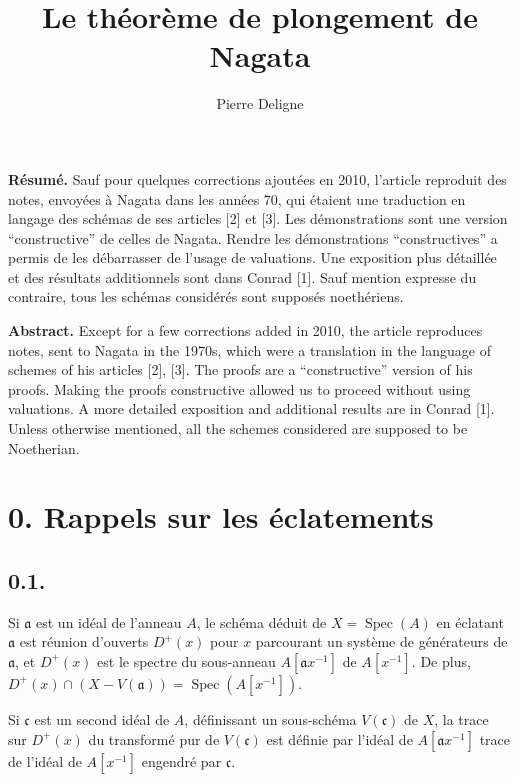 \documentclass[11pt,a4paper]{article}
\title{\textbf{Le th\'eor\`eme de plongement de Nagata}}
\author{Pierre Deligne}
\date{}
\theoremstyle{plain}
\theoremstyle{definition}
\DeclareMathOperator{\Spec}{Spec}
\begin{document}
\maketitle

\noindent\textbf{R\'esum\'e.} Sauf pour quelques corrections ajout\'ees en 2010, l'article reproduit des notes, envoy\'ees \`a Nagata dans les ann\'ees 70, qui \'etaient une traduction en langage des sch\'emas de ses articles [2] et [3]. Les d\'emonstrations sont une version ``constructive'' de celles de Nagata. Rendre les d\'emonstrations ``constructives'' a permis de les d\'ebarrasser de l'usage de valuations. Une exposition plus d\'etaill\'ee et des r\'esultats additionnels sont dans Conrad [1]. Sauf mention expresse du contraire, tous les sch\'emas consid\'er\'es sont suppos\'es noeth\'eriens.

\bigskip
\noindent\textbf{Abstract.} Except for a few corrections added in 2010, the article reproduces notes, sent to Nagata in the 1970s, which were a translation in the language of schemes of his articles [2], [3]. The proofs are a ``constructive'' version of his proofs. Making the proofs constructive allowed us to proceed without using valuations. A more detailed exposition and additional results are in Conrad [1]. Unless otherwise mentioned, all the schemes considered are supposed to be Noetherian.

\section*{0. Rappels sur les \'eclatements}

\subsection*{0.1.}

Si $\mathfrak{a}$ est un id\'eal de l'anneau $A$, le sch\'ema d\'eduit de $X = \Spec(A)$ en \'eclatant $\mathfrak{a}$ est r\'eunion d'ouverts $D^+(x)$ pour $x$ parcourant un syst\`eme de g\'en\'erateurs de $\mathfrak{a}$, et $D^+(x)$ est le spectre du sous-anneau $A[\mathfrak{a}x^{-1}]$ de $A[x^{-1}]$. De plus, $D^+(x) \cap (X - V(\mathfrak{a})) = \Spec(A[x^{-1}])$.

Si $\mathfrak{c}$ est un second id\'eal de $A$, d\'efinissant un sous-sch\'ema $V(\mathfrak{c})$ de $X$, la trace sur $D^+(x)$ du transform\'e pur de $V(\mathfrak{c})$ est d\'efinie par l'id\'eal de $A[\mathfrak{a}x^{-1}]$ trace de l'id\'eal de $A[x^{-1}]$ engendr\'e par $\mathfrak{c}$.
\end{document}
